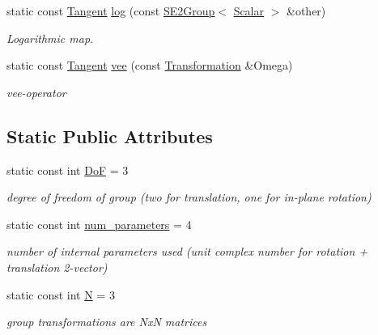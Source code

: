 \begin{DoxyCompactItemize}
static const \hyperlink{class_sophus_1_1_s_e2_group_base_a71b41e6cde48514241c7bffcbe34923f}{Tangent} \hyperlink{class_sophus_1_1_s_e2_group_base_aecc7909b366aa35b033f6c704441ac70}{log} (const \hyperlink{class_sophus_1_1_s_e2_group}{S\+E2\+Group}$<$ \hyperlink{class_sophus_1_1_s_e2_group_base_a1bad7970c24437df7f4a34281ff147fe}{Scalar} $>$ \&other)
\begin{DoxyCompactList}\small\item\em Logarithmic map. \end{DoxyCompactList}\item 
static const \hyperlink{class_sophus_1_1_s_e2_group_base_a71b41e6cde48514241c7bffcbe34923f}{Tangent} \hyperlink{class_sophus_1_1_s_e2_group_base_a7d4d4cab49ee63e2e2592f3637cdac34}{vee} (const \hyperlink{class_sophus_1_1_s_e2_group_base_a82fe531d4b64813525d4ebd131da9bcd}{Transformation} \&Omega)
\begin{DoxyCompactList}\small\item\em vee-\/operator \end{DoxyCompactList}\end{DoxyCompactItemize}
\subsection*{Static Public Attributes}
\begin{DoxyCompactItemize}
\item 
static const int \hyperlink{class_sophus_1_1_s_e2_group_base_ab94ffc7ab0cbd8986e6f2ab35c50dbb1}{DoF} = 3\hypertarget{class_sophus_1_1_s_e2_group_base_ab94ffc7ab0cbd8986e6f2ab35c50dbb1}{}\label{class_sophus_1_1_s_e2_group_base_ab94ffc7ab0cbd8986e6f2ab35c50dbb1}

\begin{DoxyCompactList}\small\item\em degree of freedom of group (two for translation, one for in-\/plane rotation) \end{DoxyCompactList}\item 
static const int \hyperlink{class_sophus_1_1_s_e2_group_base_a304bd88bbf7f60bb7f8982d84fdb9653}{num\+\_\+parameters} = 4\hypertarget{class_sophus_1_1_s_e2_group_base_a304bd88bbf7f60bb7f8982d84fdb9653}{}\label{class_sophus_1_1_s_e2_group_base_a304bd88bbf7f60bb7f8982d84fdb9653}

\begin{DoxyCompactList}\small\item\em number of internal parameters used (unit complex number for rotation + translation 2-\/vector) \end{DoxyCompactList}\item 
static const int \hyperlink{class_sophus_1_1_s_e2_group_base_a07b0f26b806ad9cd07184d817bc462a1}{N} = 3\hypertarget{class_sophus_1_1_s_e2_group_base_a07b0f26b806ad9cd07184d817bc462a1}{}\label{class_sophus_1_1_s_e2_group_base_a07b0f26b806ad9cd07184d817bc462a1}

\begin{DoxyCompactList}\small\item\em group transformations are NxN matrices \end{DoxyCompactList}\end{DoxyCompactItemize}


